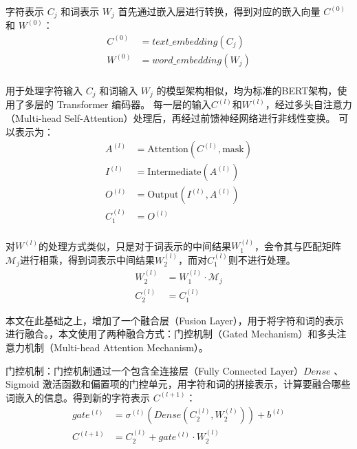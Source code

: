 \documentclass[12pt, a4paper]{ctexart}
\begin{document}
字符表示 $C_j$ 和词表示 $W_j$ 首先通过嵌入层进行转换，得到对应的嵌入向量 $C^{(0)}$ 和 $W^{(0)}$：
\begin{equation}
    \begin{split}
        C^{(0)} &= text\_embedding(C_j) \\
        W^{(0)} &= word\_embedding(W_j) \\
    \end{split}
\end{equation}

用于处理字符输入 $C_j$ 和词输入 $W_j$ 的模型架构相似，均为标准的BERT架构，使用了多层的 Transformer 编码器。
每一层的输入$C^{(l)}$和$W^{(l)}$，经过多头自注意力（Multi-head Self-Attention）处理后，再经过前馈神经网络进行非线性变换。
可以表示为：
\begin{equation}
    \begin{split}
        A^{(l)} &= \text{Attention}(C^{(l)}, \text{mask})\\
        I^{(l)} &= \text{Intermediate}(A^{(l)})\\
        O^{(l)} &= \text{Output}(I^{(l)}, A^{(l)})\\
        C^{(l)}_1 &= O^{(l)} \\
    \end{split}
\end{equation}

对$W^{(l)}$的处理方式类似，只是对于词表示的中间结果$W^{(l)}_1$，会令其与匹配矩阵${\mathcal{M}}_j$进行相乘，得到词表示中间结果$W^{(l)}_2$，而对$C^{(l)}_1$则不进行处理。
\begin{equation}
    \begin{split}
        W^{(l)}_2 &= W^{(l)}_1 \cdot {\mathcal{M}}_j \\
        C^{(l)}_2 &= C^{(l)}_1
    \end{split}
\end{equation}

本文在此基础之上，增加了一个融合层（Fusion Layer），用于将字符和词的表示进行融合。，本文使用了两种融合方式：门控机制（Gated Mechanism）和多头注意力机制（Multi-head Attention Mechanism）。

\vspace{2em} %

门控机制：门控机制通过一个包含全连接层（Fully Connected Layer）$Dense$ 、Sigmoid 激活函数和偏置项的门控单元，用字符和词的拼接表示，计算要融合哪些词嵌入的信息。得到新的字符表示 $C^{(l+1)}$：
\begin{equation}
    \begin{split}
        gate^{(l)} &= {\sigma}^{(l)} (Dense(C^{(l)}_2, W^{(l)}_2) ) + b^{(l)} \\
        C^{(l+1)} &= C^{(l)}_2 + gate^{(l)} \cdot W^{(l)}_2 \\
    \end{split}
\end{equation}
\end{document}
